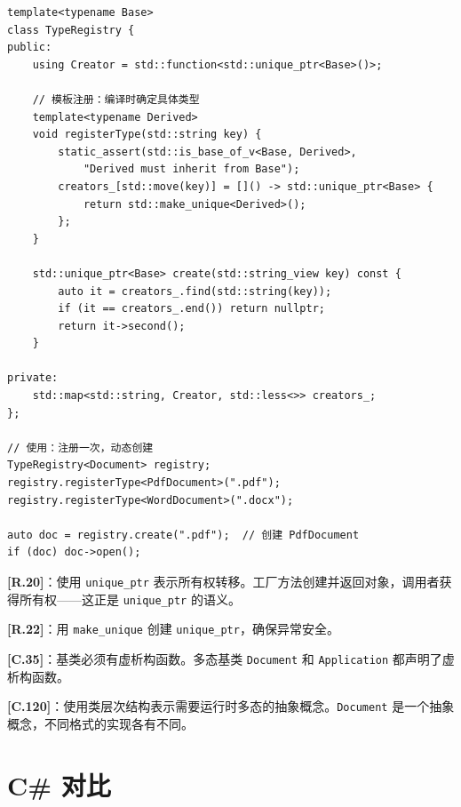 \documentclass[12pt,a4paper,fontset=fandol]{ctexbook}
\newcommand{\guideref}[1]{\textbf{\textcolor{blue!70!black}{[#1]}}}
\begin{document}
\begin{lstlisting}[style=cppstyle, caption={模板类型注册工厂 --- C++20}]
template<typename Base>
class TypeRegistry {
public:
    using Creator = std::function<std::unique_ptr<Base>()>;

    // 模板注册：编译时确定具体类型
    template<typename Derived>
    void registerType(std::string key) {
        static_assert(std::is_base_of_v<Base, Derived>,
            "Derived must inherit from Base");
        creators_[std::move(key)] = []() -> std::unique_ptr<Base> {
            return std::make_unique<Derived>();
        };
    }

    std::unique_ptr<Base> create(std::string_view key) const {
        auto it = creators_.find(std::string(key));
        if (it == creators_.end()) return nullptr;
        return it->second();
    }

private:
    std::map<std::string, Creator, std::less<>> creators_;
};

// 使用：注册一次，动态创建
TypeRegistry<Document> registry;
registry.registerType<PdfDocument>(".pdf");
registry.registerType<WordDocument>(".docx");

auto doc = registry.create(".pdf");  // 创建 PdfDocument
if (doc) doc->open();
\end{lstlisting}

\begin{guideline}
\guideref{R.20}：使用 \texttt{unique\_ptr} 表示所有权转移。工厂方法创建并返回对象，调用者获得所有权——这正是 \texttt{unique\_ptr} 的语义。

\guideref{R.22}：用 \texttt{make\_unique} 创建 \texttt{unique\_ptr}，确保异常安全。

\guideref{C.35}：基类必须有虚析构函数。多态基类 \texttt{Document} 和 \texttt{Application} 都声明了虚析构函数。

\guideref{C.120}：使用类层次结构表示需要运行时多态的抽象概念。\texttt{Document} 是一个抽象概念，不同格式的实现各有不同。
\end{guideline}

\section{C\# 对比}
\end{document}
